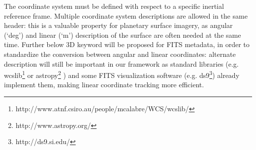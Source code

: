 The coordinate system must be defined with respect to a specific inertial reference frame.
% 
% 
Multiple coordinate system descriptions are allowed in the same header: this is a
valuable property for planetary surface imagery, as angular (`deg') and linear (`m')
description of the surface are often needed at the same time.
Further below 3D keyword will be proposed for FITS metadata, in order to standardize
the conversion between angular and linear coordinates: alternate description will still
be important in our framework as standard libraries (e.g.
wcslib\footnote{http://www.atnf.csiro.au/people/mcalabre/WCS/wcslib/} or
astropy\footnote{http://www.astropy.org/} \citet{astropy}) and some FITS visualization
software (e.g. ds9\footnote{http://ds9.si.edu/}) already implement them, making linear
coordinate tracking more efficient.  

